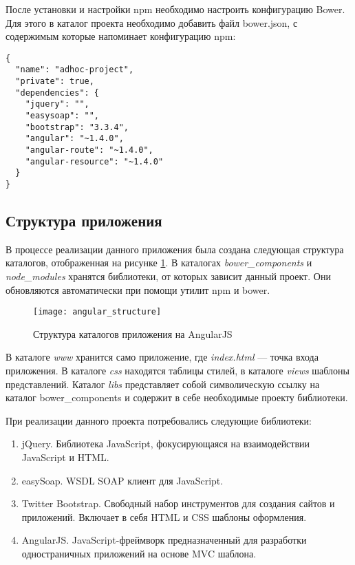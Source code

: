 После установки и настройки npm необходимо настроить конфигурацию Bower. Для этого в каталог проекта необходимо добавить файл bower.json, с содержимым которые напоминает конфигурацию npm:
\begin{lstlisting}
{
  "name": "adhoc-project",
  "private": true,
  "dependencies": {
    "jquery": "",
    "easysoap": "",
    "bootstrap": "3.3.4",
    "angular": "~1.4.0",
    "angular-route": "~1.4.0",
    "angular-resource": "~1.4.0"
  }
}
\end{lstlisting}

\subsection{Структура приложения}

В процессе реализации данного приложения была создана следующая структура каталогов, отображенная на рисунке \ref{angular_structure}. В каталогах \textit{bower\_components} и \textit{node\_modules} хранятся библиотеки, от которых зависит данный проект. Они обновляются автоматически при помощи утилит npm и bower.
\begin{figure}[h]
\center\texttt{[image: angular\_structure]}
\caption{Структура каталогов приложения на AngularJS}\label{angular_structure}
\end{figure}

В каталоге \textit{www} хранится само приложение, где \textit{index.html} --- точка входа приложения. В каталоге \textit{css} находятся таблицы стилей, в каталоге \textit{views} шаблоны представлений. Каталог \textit{libs} представляет собой символическую ссылку на каталог bower\_components и содержит в себе необходимые проекту библиотеки.

При реализации данного проекта потребовались следующие библиотеки:
\begin{enumerate}
 \item jQuery. Библиотека JavaScript, фокусирующаяся на взаимодействии JavaScript и HTML\cite{jquery}.
 \item easySoap. WSDL SOAP клиент для JavaScript.
 \item Twitter Bootstrap. Свободный набор инструментов для создания сайтов и приложений. Включает в себя HTML и CSS шаблоны оформления\cite{bootstrap}.
 \item AngularJS. JavaScript-фреймворк предназначенный для разработки одностраничных приложений на основе MVC шаблона\cite{angular}.
\end{enumerate}

